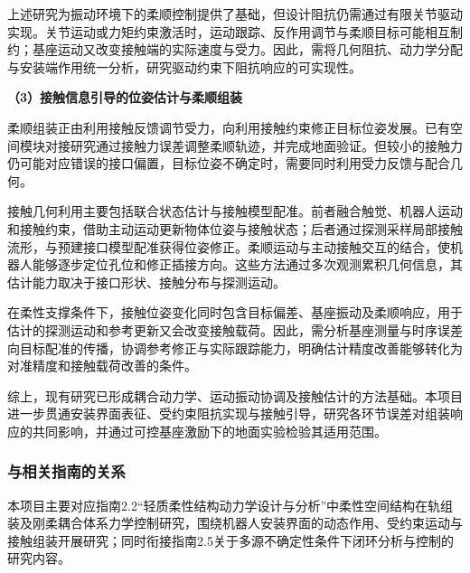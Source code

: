 \documentclass[UTF8,a4paper,zihao=-4,fontset=fandol]{ctexart}
\newcommand{\topic}[1]{\par\Needspace{4\baselineskip}\addvspace{0.5em}\noindent\textbf{#1}\par\nobreak}
\newcommand{\rev}[1]{{\color{red}#1}}
\begin{document}
\rev{上述研究}为\rev{振动环境下的柔顺}控制提供了基础，但设计阻抗仍需通过\rev{有限}关节驱动实现\rev{。关节运动或力矩约束激活时}，运动跟踪、反作用调节与柔顺目标可能\rev{相互制约}；基座运动又改变接触端的实际速度与受力。因此，\rev{需将几何阻抗、动力学分配与安装端作用统一分析，}研究驱动约束下\rev{阻抗响应的}可实现性。

\topic{（3）接触信息引导的位姿估计与柔顺组装}

柔顺组装正由利用接触反馈调节受力，\rev{向}利用接触约束修正目标\rev{位姿发展}。已有空间模块对接研究\rev{通过}接触力误差调整柔顺轨迹，并\rev{完成}地面验证\cite{shi2024}。\rev{但}较小\rev{的}接触力\rev{仍可能对应}错误的接口偏置，目标位姿不确定\rev{时}，需要同时利用\rev{受力反馈}与配合几何。

接触几何利用\rev{主要包括}联合状态估计\rev{与}接触模型配准。前者\rev{融合}触觉、机器人运动和接触约束，\rev{借助}主动运动更新物体位姿与接触状态\cite{kimtactile2023}；后者通过探测采样局部接触流形，与\rev{预建}接口模型配准获得位姿修正\cite{negi2025}。柔顺运动与主动接触交互的结合，使机器人能够逐步定位孔位\rev{和}修正插接方向\cite{chen2025}。\rev{这些}方法\rev{通过多次观测累积几何}信息，\rev{其估计能力取决于接口形状、接触分布}与\rev{探测运动}。

\rev{在}柔性支撑条件下，接触位姿变化同时\rev{包含}目标偏差、基座振动\rev{及}柔顺响应\rev{，}用于估计的探测运动和参考更新又会改变接触\rev{载荷}。因此，\rev{需分析基座测量与时序误差向目标配准}的\rev{传播}，协调参考修正与实际\rev{跟踪能力，明确估计精度改善能够转化为对准精度和接触载荷改善的条件}。

综上，\rev{现有}研究已形成耦合动力学、运动振动协调\rev{及}接触估计的方法基础。\rev{本项目进一步贯通安装界面表征、受约束阻抗实现与接触引导，研究各环节误差对组装响应的共同影响，并通过可控基座激励}下的地面\rev{实验检验其适用范围}。

\subsubsection{与相关指南的关系}

本项目主要对应指南2.2“轻质柔性结构动力学设计与分析”中柔性空间结构在轨组装及刚柔耦合体系力学控制研究，围绕机器人安装界面的动态作用、受约束运动与接触组装开展研究；同时衔接指南2.5关于多源不确定性条件下闭环分析与控制的研究内容。
\begingroup
\small
{}
\setlength{\parskip}{0pt}
\end{document}
